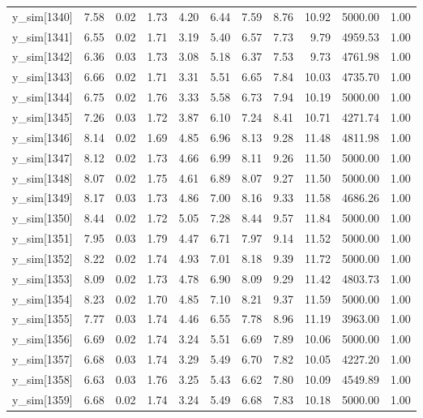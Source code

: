\begin{table}[ht]
\begin{tabular}{rrrrrrrrrrr}
  y\_sim[1340] & 7.58 & 0.02 & 1.73 & 4.20 & 6.44 & 7.59 & 8.76 & 10.92 & 5000.00 & 1.00 \\ 
  y\_sim[1341] & 6.55 & 0.02 & 1.71 & 3.19 & 5.40 & 6.57 & 7.73 & 9.79 & 4959.53 & 1.00 \\ 
  y\_sim[1342] & 6.36 & 0.03 & 1.73 & 3.08 & 5.18 & 6.37 & 7.53 & 9.73 & 4761.98 & 1.00 \\ 
  y\_sim[1343] & 6.66 & 0.02 & 1.71 & 3.31 & 5.51 & 6.65 & 7.84 & 10.03 & 4735.70 & 1.00 \\ 
  y\_sim[1344] & 6.75 & 0.02 & 1.76 & 3.33 & 5.58 & 6.73 & 7.94 & 10.19 & 5000.00 & 1.00 \\ 
  y\_sim[1345] & 7.26 & 0.03 & 1.72 & 3.87 & 6.10 & 7.24 & 8.41 & 10.71 & 4271.74 & 1.00 \\ 
  y\_sim[1346] & 8.14 & 0.02 & 1.69 & 4.85 & 6.96 & 8.13 & 9.28 & 11.48 & 4811.98 & 1.00 \\ 
  y\_sim[1347] & 8.12 & 0.02 & 1.73 & 4.66 & 6.99 & 8.11 & 9.26 & 11.50 & 5000.00 & 1.00 \\ 
  y\_sim[1348] & 8.07 & 0.02 & 1.75 & 4.61 & 6.89 & 8.07 & 9.27 & 11.50 & 5000.00 & 1.00 \\ 
  y\_sim[1349] & 8.17 & 0.03 & 1.73 & 4.86 & 7.00 & 8.16 & 9.33 & 11.58 & 4686.26 & 1.00 \\ 
  y\_sim[1350] & 8.44 & 0.02 & 1.72 & 5.05 & 7.28 & 8.44 & 9.57 & 11.84 & 5000.00 & 1.00 \\ 
  y\_sim[1351] & 7.95 & 0.03 & 1.79 & 4.47 & 6.71 & 7.97 & 9.14 & 11.52 & 5000.00 & 1.00 \\ 
  y\_sim[1352] & 8.22 & 0.02 & 1.74 & 4.93 & 7.01 & 8.18 & 9.39 & 11.72 & 5000.00 & 1.00 \\ 
  y\_sim[1353] & 8.09 & 0.02 & 1.73 & 4.78 & 6.90 & 8.09 & 9.29 & 11.42 & 4803.73 & 1.00 \\ 
  y\_sim[1354] & 8.23 & 0.02 & 1.70 & 4.85 & 7.10 & 8.21 & 9.37 & 11.59 & 5000.00 & 1.00 \\ 
  y\_sim[1355] & 7.77 & 0.03 & 1.74 & 4.46 & 6.55 & 7.78 & 8.96 & 11.19 & 3963.00 & 1.00 \\ 
  y\_sim[1356] & 6.69 & 0.02 & 1.74 & 3.24 & 5.51 & 6.69 & 7.89 & 10.06 & 5000.00 & 1.00 \\ 
  y\_sim[1357] & 6.68 & 0.03 & 1.74 & 3.29 & 5.49 & 6.70 & 7.82 & 10.05 & 4227.20 & 1.00 \\ 
  y\_sim[1358] & 6.63 & 0.03 & 1.76 & 3.25 & 5.43 & 6.62 & 7.80 & 10.09 & 4549.89 & 1.00 \\ 
  y\_sim[1359] & 6.68 & 0.02 & 1.74 & 3.24 & 5.49 & 6.68 & 7.83 & 10.18 & 5000.00 & 1.00 \\ 

\end{tabular}
\end{table}
